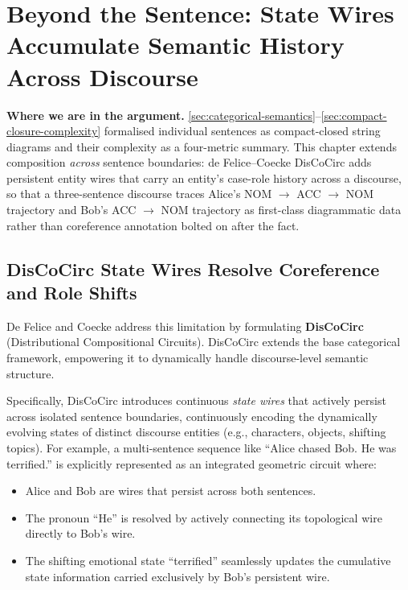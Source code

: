 \documentclass[
]{article}
\providecommand{\tightlist}{%
  \setlength{\itemsep}{0pt}\setlength{\parskip}{0pt}}
\begin{document}
\newpage

\section{Beyond the Sentence: State Wires Accumulate Semantic History
Across Discourse}\label{sec:discocirc-discourse}

\textbf{Where we are in the argument.}
\autoref{sec:categorical-semantics}--\autoref{sec:compact-closure-complexity}
formalised individual sentences as compact-closed string diagrams and
their complexity as a four-metric summary. This chapter extends
composition \emph{across} sentence boundaries: de Felice--Coecke
DisCoCirc adds persistent entity wires that carry an entity's case-role
history across a discourse, so that a three-sentence discourse traces
Alice's NOM \texorpdfstring{\ensuremath{\to}}{->} ACC \texorpdfstring{\ensuremath{\to}}{->} NOM trajectory and Bob's ACC \texorpdfstring{\ensuremath{\to}}{->} NOM trajectory as
first-class diagrammatic data rather than coreference annotation bolted
on after the fact.

\subsection{DisCoCirc State Wires Resolve Coreference and Role
Shifts}\label{discocirc-state-wires-resolve-coreference-and-role-shifts}

De Felice and Coecke \citeyearpar{defelice2020discourse} address this
limitation by formulating \textbf{DisCoCirc} (Distributional
Compositional Circuits). DisCoCirc extends the base categorical
framework, empowering it to dynamically handle discourse-level semantic
structure.

Specifically, DisCoCirc introduces continuous \emph{state wires} that
actively persist across isolated sentence boundaries, continuously
encoding the dynamically evolving states of distinct discourse entities
(e.g., characters, objects, shifting topics). For example, a
multi-sentence sequence like ``Alice chased Bob. He was terrified.'' is
explicitly represented as an integrated geometric circuit where:

\begin{itemize}
\tightlist
\item
  Alice and Bob are wires that persist across both sentences.
\item
  The pronoun ``He'' is resolved by actively connecting its topological
  wire directly to Bob's wire.
\item
  The shifting emotional state ``terrified'' seamlessly updates the
  cumulative state information carried exclusively by Bob's persistent
  wire.
\end{itemize}
\end{document}
